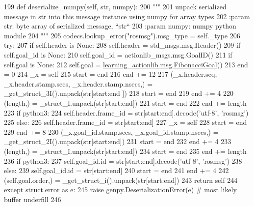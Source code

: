 \begin{DoxyCode}
199   \textcolor{keyword}{def }deserialize\_numpy(self, str, numpy):
200     \textcolor{stringliteral}{"""}
201 \textcolor{stringliteral}{    unpack serialized message in str into this message instance using numpy for array types}
202 \textcolor{stringliteral}{    :param str: byte array of serialized message, ``str``}
203 \textcolor{stringliteral}{    :param numpy: numpy python module}
204 \textcolor{stringliteral}{    """}
205     codecs.lookup\_error(\textcolor{stringliteral}{"rosmsg"}).msg\_type = self.\_type
206     \textcolor{keywordflow}{try}:
207       \textcolor{keywordflow}{if} self.header \textcolor{keywordflow}{is} \textcolor{keywordtype}{None}:
208         self.header = std\_msgs.msg.Header()
209       \textcolor{keywordflow}{if} self.goal\_id \textcolor{keywordflow}{is} \textcolor{keywordtype}{None}:
210         self.goal\_id = actionlib\_msgs.msg.GoalID()
211       \textcolor{keywordflow}{if} self.goal \textcolor{keywordflow}{is} \textcolor{keywordtype}{None}:
212         self.goal = \hyperlink{classlearning__actionlib_1_1msg_1_1__FibonacciGoal_1_1FibonacciGoal}{learning\_actionlib.msg.FibonacciGoal}()
213       end = 0
214       \_x = self
215       start = end
216       end += 12
217       (\_x.header.seq, \_x.header.stamp.secs, \_x.header.stamp.nsecs,) = \_get\_struct\_3I().unpack(str[start:end
      ])
218       start = end
219       end += 4
220       (length,) = \_struct\_I.unpack(str[start:end])
221       start = end
222       end += length
223       \textcolor{keywordflow}{if} python3:
224         self.header.frame\_id = str[start:end].decode(\textcolor{stringliteral}{'utf-8'}, \textcolor{stringliteral}{'rosmsg'})
225       \textcolor{keywordflow}{else}:
226         self.header.frame\_id = str[start:end]
227       \_x = self
228       start = end
229       end += 8
230       (\_x.goal\_id.stamp.secs, \_x.goal\_id.stamp.nsecs,) = \_get\_struct\_2I().unpack(str[start:end])
231       start = end
232       end += 4
233       (length,) = \_struct\_I.unpack(str[start:end])
234       start = end
235       end += length
236       \textcolor{keywordflow}{if} python3:
237         self.goal\_id.id = str[start:end].decode(\textcolor{stringliteral}{'utf-8'}, \textcolor{stringliteral}{'rosmsg'})
238       \textcolor{keywordflow}{else}:
239         self.goal\_id.id = str[start:end]
240       start = end
241       end += 4
242       (self.goal.order,) = \_get\_struct\_i().unpack(str[start:end])
243       \textcolor{keywordflow}{return} self
244     \textcolor{keywordflow}{except} struct.error \textcolor{keyword}{as} e:
245       \textcolor{keywordflow}{raise} genpy.DeserializationError(e)  \textcolor{comment}{# most likely buffer underfill}
246 
\end{DoxyCode}
